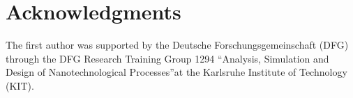 \section*{Acknowledgments}
The first author was supported by the Deutsche Forschungsgemeinschaft (DFG) through the DFG
Research Training Group 1294 \textquotedblleft Analysis, Simulation and Design of Nanotechnological Processes\textquotedblright at the Karlsruhe Institute of Technology (KIT).
